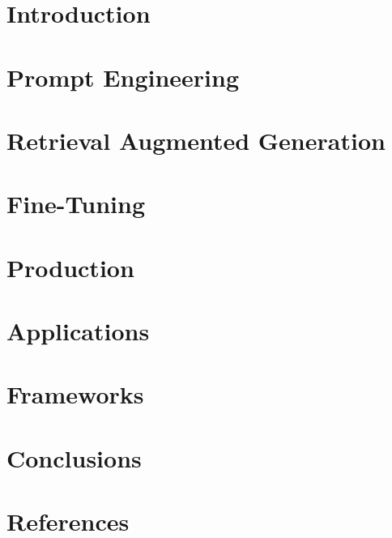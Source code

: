 \section[Intro]{Introduction}






\section[Prompts]{Prompt Engineering}




\section[RAG]{Retrieval Augmented Generation}





\section[FT]{Fine-Tuning}


\section[Prod]{Production}





\section[Apps]{Applications}



\section[Frameworks]{Frameworks}








\section[Concl]{Conclusions}


\section[Refs]{References}


